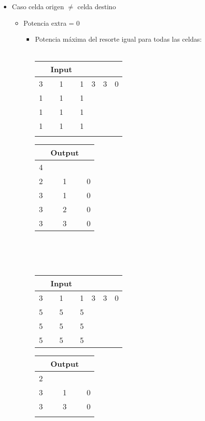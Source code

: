 \documentclass[11pt, a4paper, twoside]{article}
\begin{document}
\begin{itemize}
\item Caso celda origen $\ne$ celda destino 
	\begin{itemize}
		\item Potencia extra = 0 \\
			\begin{itemize}
				\item Potencia m\'axima del resorte igual para todas las celdas: \\
				\\
					\begin{minipage}{0.4\textwidth}
							\begin{tabular}{cccccc}
							 & Input \\
							   \hline
							   3 & 1 & 1 & 3 & 3 & 0\\
							   1 & 1 & 1 &   &   &  \\
							   1 & 1 & 1 &   &   &  \\
							   1 & 1 & 1 &   &   &  \\
							   \\
							\end{tabular}
						\end{minipage} 
							\begin{minipage}{0.3\textwidth}
								\begin{tabular}{ccc}
								  & Output \\
								   \hline
								   4 &   &   \\
								   2 & 1 & 0 \\
								   3 & 1 & 0 \\
								   3 & 2 & 0 \\
								   3 & 3 & 0 \\
							\end{tabular}
					\end{minipage} 	\\
					\\ \\
					\begin{minipage}{0.4\textwidth}
							\begin{tabular}{cccccc}
							   & Input  \\
							   \hline
							   3 & 1 & 1 & 3 & 3 & 0\\
							   5 & 5 & 5 &   &   &  \\
							   5 & 5 & 5 &   &   &  \\
							   5 & 5 & 5 &   &   &  \\
							\end{tabular}
					\end{minipage} 
					\begin{minipage}{0.3\textwidth}
							\begin{tabular}{ccc}
								   & Output \\
								   \hline
								   2 &   &   \\
								   3 & 1 & 0 \\
								   3 & 3 & 0 \\
								   \\
							\end{tabular}
					\end{minipage} 	\\


\end{itemize}
\end{itemize}
\end{itemize}
\end{document}
